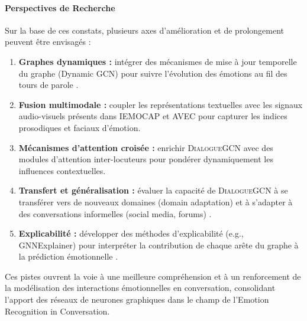 \documentclass[a4paper,11pt]{article}
\begin{document}
\paragraph{Perspectives de Recherche}
Sur la base de ces constats, plusieurs axes d'amélioration et de prolongement peuvent être envisagés :
\begin{enumerate}
  \item \textbf{Graphes dynamiques :} intégrer des mécanismes de mise à jour temporelle du graphe (Dynamic GCN) pour suivre l'évolution des émotions au fil des tours de parole \cite{zhao2021multi}.  
  \item \textbf{Fusion multimodale :} coupler les représentations textuelles avec les signaux audio-visuels présents dans IEMOCAP et AVEC \cite{chen2017multimodal} pour capturer les indices prosodiques et faciaux d'émotion.  
  \item \textbf{Mécanismes d'attention croisée :} enrichir \textsc{DialogueGCN} avec des modules d'attention inter-locuteurs \cite{vaswani2017attention} pour pondérer dynamiquement les influences contextuelles.  
  \item \textbf{Transfert et généralisation :} évaluer la capacité de \textsc{DialogueGCN} à se transférer vers de nouveaux domaines (domain adaptation) et à s'adapter à des conversations informelles (social media, forums) \cite{pennington2014glove}.  
  \item \textbf{Explicabilité :} développer des méthodes d'explicabilité (e.g., GNNExplainer) pour interpréter la contribution de chaque arête du graphe à la prédiction émotionnelle \cite{velickovic2017graph}.  
\end{enumerate}

Ces pistes ouvrent la voie à une meilleure compréhension et à un renforcement de la modélisation des interactions émotionnelles en conversation, consolidant l'apport des réseaux de neurones graphiques dans le champ de l'Emotion Recognition in Conversation.
\newpage








\end{document}

